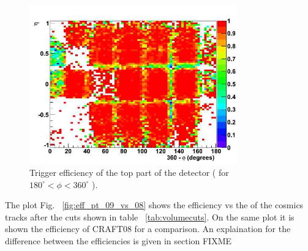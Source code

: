 \begin{figure}[hbtp]
     \begin{minipage}{1.0\textwidth}
     \begin{center}
      \includegraphics[width=0.8\textwidth]{eff_eta_phi_bot_09}
       \caption{ Trigger efficiency of the top part of the detector (
 for $ 180^\circ < \phi < 360^\circ $ ). %
}
    \label{fig:eff_eta_phi_bot_09}


  \end{center}
  \end{minipage}
     


\end{figure}





The plot Fig. ~\ref{fig:eff_pt_09_vs_08} shows the efficiency vs the
\pt of the cosmics tracks after the cuts shown in table
~\ref{tab:volumecuts}. On the same plot it is shown 
the efficiency of CRAFT08 for a comparison.
An explaination for the difference between the efficiencies
is given in section FIXME 



